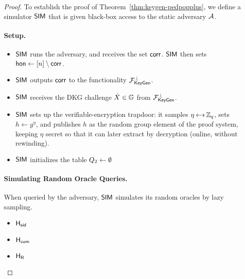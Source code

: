 \begin{proof}
    To establish the proof of Theorem~\ref{thm:keygen-pedpopplus},
    we define a simulator $\mathsf{SIM}$ that is given black-box access to the static adversary $\mathcal{A}$.


    \medskip

    \paragraph{\bf Setup.}
    \begin{itemize}
        \item $\mathsf{SIM}$ runs the adversary,
        and receives the set $\mathsf{corr}$.
        $\mathsf{SIM}$ then sets $\mathsf{hon} \gets [n] \setminus \mathsf{corr}$.
        \item $\mathsf{SIM}$ outputs $\mathsf{corr}$ to the functionality $\mathcal{F}_{\mathsf{KeyGen}}^\bot$.
        \item $\mathsf{SIM}$ receives the DKG challenge $\dot{X} \in \mathbb{G}$ from $\mathcal{F}_{\mathsf{KeyGen}}^\bot$.
        \item $\mathsf{SIM}$ sets up the verifiable-encryption trapdoor: it samples $\eta \rgets \Zq$, sets
        $h \gets g^{\eta}$, and publishes $h$ as the random group element of the proof system,
        keeping $\eta$ secret so that it can later extract by decryption (online, without rewinding).
        \item $\mathsf{SIM}$ initializes the table $Q_{2} \gets \emptyset$
    \end{itemize}

    \medskip

    \paragraph{\bf Simulating Random Oracle Queries.}
    When queried by the adversary,
    $\mathsf{SIM}$ simulates its random oracles by lazy sampling.
    \begin{itemize}
      \item $\mathsf{H_{\mathsf{sid}}}$
      \item $\mathsf{H_{\mathsf{com}}}$
      \item $\mathsf{H_{\mathsf{R}}}$
    \end{itemize}


\end{proof}
